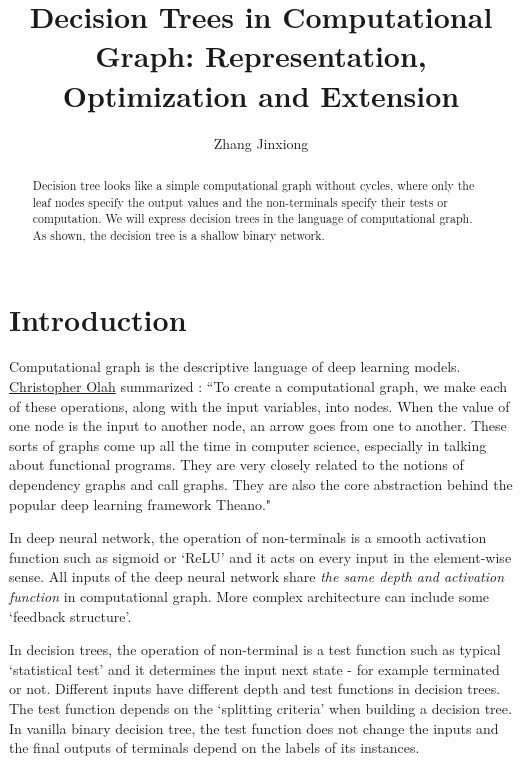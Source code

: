 \documentclass[UTF8]{article}
\title{Decision Trees in Computational Graph: Representation, Optimization and  Extension}
\author{Zhang Jinxiong}
\begin{document}
\maketitle

\begin{abstract}

Decision tree looks like a simple computational graph without cycles,
where only the leaf nodes specify the output values and the non-terminals specify their tests or computation.
We will express decision trees in the language of computational graph.
As shown, the decision tree is a shallow binary network.
\end{abstract}

\section{Introduction}

Computational graph is the descriptive language of deep learning models.
\href{https://colah.github.io/posts/2015-08-Backprop/}{Christopher Olah} summarized :
``To create a computational graph,
we make each of these operations, along with the input variables, into nodes.
When the value of one node  is the input to another node, an arrow goes from one to another.
These sorts of graphs come up all the time in computer science,
especially in talking about functional programs.
They are very closely related to the notions of dependency graphs and call graphs.
They are also the core abstraction behind the popular deep learning framework Theano."

In deep neural network, the operation of non-terminals is a smooth activation function such as sigmoid or `ReLU'
and it acts on every input in the element-wise sense.
All inputs of the deep neural network share  \emph{the same depth and activation function} in computational graph.
More complex architecture can include some `feedback structure'.

In decision trees, the operation of non-terminal is a test function such as typical `statistical test'
and it determines the input next state - for example terminated or not.
Different inputs have different depth and test functions in decision trees.
The test function depends on the `splitting criteria' when building a decision tree.
In vanilla binary decision tree,
the test function does not change the inputs
and the final outputs of terminals depend on the labels of its instances.
\end{document}
